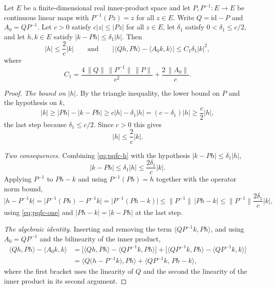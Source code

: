 \begin{lemma}
Let $E$ be a finite-dimensional real inner-product space and let
$P,P^{-1}:E\to E$ be continuous linear maps with $P^{-1}(Pz)=z$ for all $z\in E$.
Write $Q=\mathrm{id}-P$ and $A_0=QP^{-1}$. Let $c>0$ satisfy
$c|z|\le|Pz|$ for all $z\in E$, let $\delta_1$ satisfy
$0<\delta_1\le c/2$, and let $h,k\in E$ satisfy $|k-Ph|\le\delta_1|h|$. Then
\[
  |h|\le\frac{2}{c}|k|
  \qquad\text{and}\qquad
  \bigl|\langle Qh,Ph\rangle-\langle A_0k,k\rangle\bigr|
    \le C_1\delta_1|k|^2,
\]
where
\[
  C_1=\frac{4\,\|Q\|\,\|P^{-1}\|\,\|P\|}{c^2}+\frac{2\,\|A_0\|}{c}.
\]
\end{lemma}
\begin{proof}
\emph{The bound on $|h|$.}
By the triangle inequality, the lower bound on $P$ and the hypothesis on $k$,
\[
  |k|\ge|Ph|-|k-Ph|\ge c|h|-\delta_1|h|=(c-\delta_1)|h|\ge\frac{c}{2}|h|,
\]
the last step because $\delta_1\le c/2$. Since $c>0$ this gives
\begin{equation}\label{eq:pqfc-h}
  |h|\le\frac{2}{c}|k| .
\end{equation}

\emph{Two consequences.}
Combining \eqref{eq:pqfc-h} with the hypothesis $|k-Ph|\le\delta_1|h|$,
\begin{equation}\label{eq:pqfc-one}
  |k-Ph|\le\delta_1|h|\le\frac{2\delta_1}{c}|k| .
\end{equation}
Applying $P^{-1}$ to $Ph-k$ and using $P^{-1}(Ph)=h$ together with the operator
norm bound,
\begin{equation}\label{eq:pqfc-two}
  \bigl|h-P^{-1}k\bigr|=\bigl|P^{-1}(Ph)-P^{-1}k\bigr|
   =\bigl|P^{-1}(Ph-k)\bigr|\le\|P^{-1}\|\,|Ph-k|
   \le\|P^{-1}\|\frac{2\delta_1}{c}|k| ,
\end{equation}
using \eqref{eq:pqfc-one} and $|Ph-k|=|k-Ph|$ at the last step.

\emph{The algebraic identity.}
Inserting and removing the term $\langle QP^{-1}k,Ph\rangle$, and using
$A_0=QP^{-1}$ and the bilinearity of the inner product,
\[
\begin{aligned}
  \langle Qh,Ph\rangle-\langle A_0k,k\rangle
   &=\bigl[\langle Qh,Ph\rangle-\langle QP^{-1}k,Ph\rangle\bigr]
     +\bigl[\langle QP^{-1}k,Ph\rangle-\langle QP^{-1}k,k\rangle\bigr]\\
   &=\bigl\langle Q\bigl(h-P^{-1}k\bigr),Ph\bigr\rangle
     +\bigl\langle QP^{-1}k,\,Ph-k\bigr\rangle ,
\end{aligned}
\]
where the first bracket uses the linearity of $Q$ and the second the linearity of
the inner product in its second argument.


\end{proof}
